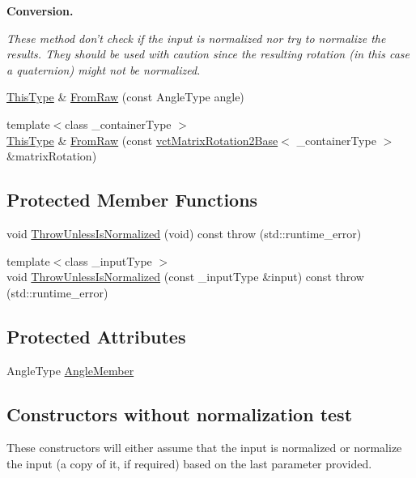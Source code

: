 \begin{Indent}{\bf Conversion.}\par
{\em These method don't check if the input is normalized nor try to normalize the results. They should be used with caution since the resulting rotation (in this case a quaternion) might not be normalized. }\begin{DoxyCompactItemize}
\item 
\hyperlink{classvct_angle_rotation2_a67339254f084f89c13aca70c1242d18e}{This\-Type} \& \hyperlink{classvct_angle_rotation2_ac3c54c73f9da662e9d0c28b5d14a81e1}{From\-Raw} (const Angle\-Type angle)
\item 
{\footnotesize template$<$class \-\_\-container\-Type $>$ }\\\hyperlink{classvct_angle_rotation2_a67339254f084f89c13aca70c1242d18e}{This\-Type} \& \hyperlink{classvct_angle_rotation2_a2eac56d4cbadfd017b3621cca6a712b8}{From\-Raw} (const \hyperlink{classvct_matrix_rotation2_base}{vct\-Matrix\-Rotation2\-Base}$<$ \-\_\-container\-Type $>$ \&matrix\-Rotation)
\end{DoxyCompactItemize}
\end{Indent}
\subsection*{Protected Member Functions}
\begin{DoxyCompactItemize}
\item 
void \hyperlink{classvct_angle_rotation2_a9d7fe4da5fe8b80abf3995ec62ac23b7}{Throw\-Unless\-Is\-Normalized} (void) const   throw (std\-::runtime\-\_\-error)
\item 
{\footnotesize template$<$class \-\_\-input\-Type $>$ }\\void \hyperlink{classvct_angle_rotation2_a47d2f2786cca424f8b4b0daf99c6e907}{Throw\-Unless\-Is\-Normalized} (const \-\_\-input\-Type \&input) const   throw (std\-::runtime\-\_\-error)
\end{DoxyCompactItemize}
\subsection*{Protected Attributes}
\begin{DoxyCompactItemize}
\item 
Angle\-Type \hyperlink{classvct_angle_rotation2_a400d22472af231f8a133eea69446ea7a}{Angle\-Member}
\end{DoxyCompactItemize}
\subsection*{Constructors without normalization test}
\label{_amgrp6d350e6340f2c7ccfd481cf2f898de43}%
These constructors will either assume that the input is normalized or normalize the input (a copy of it, if required) based on the last parameter provided.


